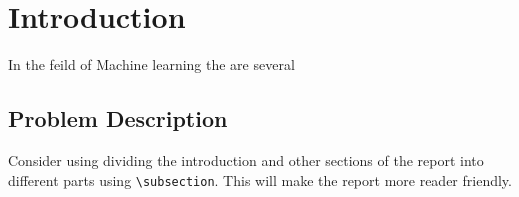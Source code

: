 \section{Introduction}



In the feild of Machine learning the are several 

\subsection{Problem Description}
Consider using dividing the introduction and other sections of the report into different parts using \verb+\subsection+. This will make the report more reader friendly. 

